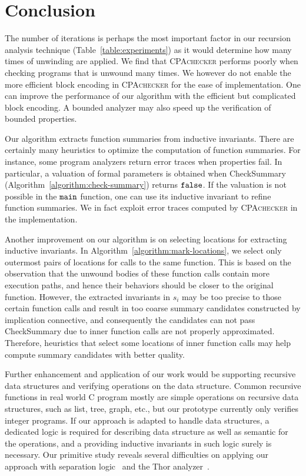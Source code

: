 
\chapter{Conclusion}\label{ch:conclusion}


The number of iterations is perhaps the most important factor in our
recursion analysis technique (Table~\ref{table:experiments}) as it would
determine how many times of unwinding are applied.
We find that \textsc{CPAchecker} performs poorly when checking programs
that is unwound many times.
We however do not enable the more efficient block encoding in
\textsc{CPAchecker} for the ease of implementation.
One can improve the performance of our algorithm with the efficient but
complicated block encoding.
A bounded analyzer may also speed up the verification of bounded properties.

Our algorithm extracts function summaries from inductive invariants.
There are certainly many heuristics to optimize the computation of
function summaries.
For instance, some program analyzers return error traces when properties fail.
In particular, a valuation of formal parameters is obtained when
\textmd{CheckSummary} (Algorithm~\ref{algorithm:check-summary}) returns $\mathtt{false}$.
If the valuation is not possible in the $\mathtt{{main}}$ function, one can use
its inductive invariant to refine function summaries.
We in fact exploit error traces computed by \textsc{CPAchecker} in the
implementation.

Another improvement on our algorithm is on selecting locations for extracting
inductive invariants.
In Algorithm~\ref{algorithm:mark-locations}, we select only outermost pairs of
locations for calls to the same function.
This is based on the observation that the unwound bodies of these function calls
contain more execution paths,
and hence their behaviors should be closer to the original function.
However, the extracted invariants in $s_i$ may be too precise to those certain
function calls and result in too coarse summary candidates constructed by
implication connective,
and consequently the candidates can not pass \textmd{CheckSummary} due to inner
function calls are not properly approximated.
Therefore, heuristics that select some locations of inner function calls may help
compute summary candidates with better quality.

Further enhancement and application of our work would be supporting recursive
data structures and verifying operations on the data structure.
Common recursive functions in real world C program mostly are simple operations
on recursive data structures, such as list, tree, graph, etc.,
but our prototype currently only verifies integer programs.
If our approach is adapted to handle data structures, a dedicated logic is
required for describing data structure as well as semantic for the operations,
and a  providing inductive invariants in such logic surely
is necessary.
Our primitive study reveals several difficulties on applying our approach with
separation logic~\cite{Reynolds02} and the Thor analyzer~\cite{MagillTLT08}.

